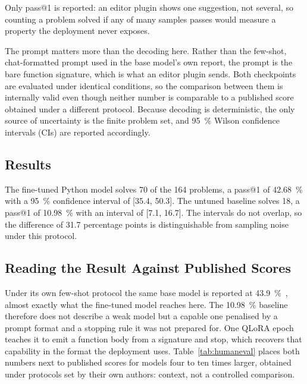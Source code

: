 \documentclass[10pt,conference,a4paper]{IEEEtran}
\begin{document}
Only pass@1 is reported: an editor plugin shows one suggestion, not several,
so counting a problem solved if any of many samples passes would measure a
property the deployment never exposes.

The prompt matters more than the decoding here. Rather than the few-shot,
chat-formatted prompt used in the base model's own report, the prompt is the
bare function signature, which is what an editor plugin sends. Both
checkpoints are evaluated under identical conditions, so the comparison
between them is internally valid even though neither number is comparable to
a published score obtained under a different protocol. Because decoding is
deterministic, the only source of uncertainty is the finite problem set, and
95~\% Wilson confidence intervals (CIs) are reported accordingly.

\subsection{Results}
The fine-tuned Python model solves 70 of the 164 problems, a pass@1 of
42.68~\% with a 95~\% confidence interval of [35.4, 50.3]. The untuned
baseline solves 18, a pass@1 of 10.98~\% with an interval of [7.1, 16.7].
The intervals do not overlap, so the difference of 31.7 percentage points is
distinguishable from sampling noise under this protocol.

\subsection{Reading the Result Against Published Scores}
Under its own few-shot protocol the same base model is reported at
43.9~\%~\cite{hui2024}, almost exactly what the fine-tuned model reaches
here. The 10.98~\% baseline therefore does not describe a weak model but a
capable one penalised by a prompt format and a stopping rule it was not
prepared for. One QLoRA epoch teaches it to emit a function body from a
signature and stop, which recovers that capability in the format the
deployment uses. Table~\ref{tab:humaneval} places both numbers next to
published scores for models four to ten times larger, obtained under
protocols set by their own authors: context, not a controlled comparison.
\end{document}
